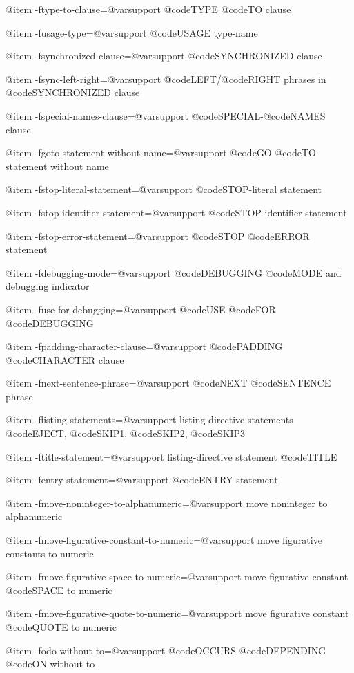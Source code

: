 @item -ftype-to-clause=@var{support}
@code{TYPE} @code{TO} clause

@item -fusage-type=@var{support}
@code{USAGE} type-name

@item -fsynchronized-clause=@var{support}
@code{SYNCHRONIZED} clause

@item -fsync-left-right=@var{support}
@code{LEFT}/@code{RIGHT} phrases in @code{SYNCHRONIZED} clause

@item -fspecial-names-clause=@var{support}
@code{SPECIAL}-@code{NAMES} clause

@item -fgoto-statement-without-name=@var{support}
@code{GO} @code{TO} statement without name

@item -fstop-literal-statement=@var{support}
@code{STOP}-literal statement

@item -fstop-identifier-statement=@var{support}
@code{STOP}-identifier statement

@item -fstop-error-statement=@var{support}
@code{STOP} @code{ERROR} statement

@item -fdebugging-mode=@var{support}
@code{DEBUGGING} @code{MODE} and debugging indicator

@item -fuse-for-debugging=@var{support}
@code{USE} @code{FOR} @code{DEBUGGING}

@item -fpadding-character-clause=@var{support}
@code{PADDING} @code{CHARACTER} clause

@item -fnext-sentence-phrase=@var{support}
@code{NEXT} @code{SENTENCE} phrase

@item -flisting-statements=@var{support}
listing-directive statements @code{EJECT}, @code{SKIP1}, @code{SKIP2}, @code{SKIP3}

@item -ftitle-statement=@var{support}
listing-directive statement @code{TITLE}

@item -fentry-statement=@var{support}
@code{ENTRY} statement

@item -fmove-noninteger-to-alphanumeric=@var{support}
move noninteger to alphanumeric

@item -fmove-figurative-constant-to-numeric=@var{support}
move figurative constants to numeric

@item -fmove-figurative-space-to-numeric=@var{support}
move figurative constant @code{SPACE} to numeric

@item -fmove-figurative-quote-to-numeric=@var{support}
move figurative constant @code{QUOTE} to numeric

@item -fodo-without-to=@var{support}
@code{OCCURS} @code{DEPENDING} @code{ON} without to

